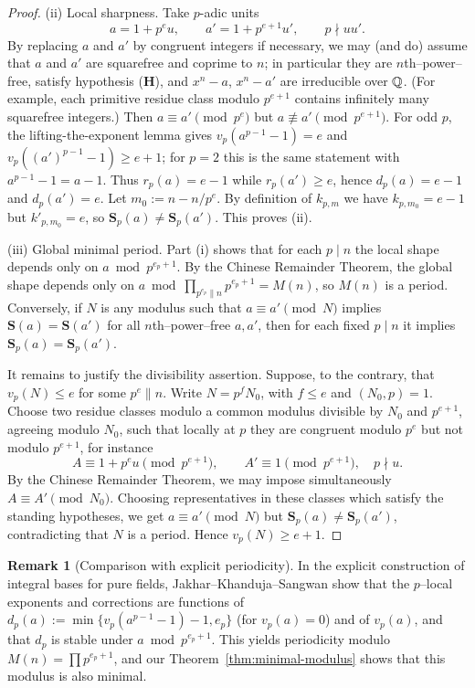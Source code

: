 \documentclass[12pt,a4paper,oneside]{amsart}
\theoremstyle{definition}
\newtheorem{remark}[theorem]{Remark}
\begin{document}
\begin{proof}
\smallskip
\noindent\textup{(ii) Local sharpness.}
Take $p$-adic units
\[
a=1+p^{e}u,\qquad a'=1+p^{e+1}u',\qquad p\nmid uu'.
\]
By replacing $a$ and $a'$ by congruent integers if necessary, we may (and do) assume that
$a$ and $a'$ are squarefree and coprime to $n$; in particular they are $n$th--power--free,
satisfy hypothesis (\textbf{H}), and $x^n-a$, $x^n-a'$ are irreducible over $\Bbb Q$.
(For example, each primitive residue class modulo $p^{e+1}$ contains infinitely many squarefree integers.) Then $a\equiv a'\pmod{p^{e}}$ but $a\not\equiv a'\pmod{p^{e+1}}$.
For odd $p$, the lifting-the-exponent lemma gives $v_p(a^{p-1}-1)=e$ and $v_p((a')^{p-1}-1)\ge e+1$; for $p=2$ this is the same statement with $a^{p-1}-1=a-1$.
Thus $r_p(a)=e-1$ while $r_p(a')\ge e$, hence $d_p(a)=e-1$ and $d_p(a')=e$.
Let $m_0:=n-n/p^{e}$. By definition of $k_{p,m}$ we have $k_{p,m_0}=e-1$ but $k'_{p,m_0}=e$, so $\mathbf S_p(a)\ne\mathbf S_p(a')$. This proves \textup{(ii)}.

\smallskip
\noindent\textup{(iii) Global minimal period.}
Part \textup{(i)} shows that for each $p\mid n$ the local shape depends only on $a\bmod p^{e_p+1}$. By the Chinese Remainder Theorem, the global shape depends only on
$a\bmod\prod_{p^{e_p}\parallel n}p^{e_p+1}=M(n)$, so $M(n)$ is a period.
Conversely, if $N$ is any modulus such that $a\equiv a'\pmod N$ implies $\mathbf S(a)=\mathbf S(a')$ for all $n$th–power–free $a,a'$, then for each fixed $p\mid n$ it implies $\mathbf S_p(a)=\mathbf S_p(a')$. 

It remains to justify the divisibility assertion. Suppose, to the contrary, that
\(v_p(N)\le e\) for some \(p^e\parallel n\). Write \(N=p^fN_0\), with
\(f\le e\) and \((N_0,p)=1\). Choose two residue classes modulo a common
modulus divisible by \(N_0\) and \(p^{e+1}\), agreeing modulo \(N_0\), such that
locally at \(p\) they are congruent modulo \(p^e\) but not modulo \(p^{e+1}\),
for instance
\[
A\equiv 1+p^eu\pmod{p^{e+1}},\qquad
A'\equiv 1\pmod{p^{e+1}},
\quad p\nmid u.
\]
By the Chinese Remainder Theorem, we may impose simultaneously
\(A\equiv A'\pmod{N_0}\). Choosing representatives in these classes which
satisfy the standing hypotheses, we get \(a\equiv a'\pmod N\) but
\(\mathbf S_p(a)\ne\mathbf S_p(a')\), contradicting that \(N\) is a period.
Hence \(v_p(N)\ge e+1\).
\end{proof}




\begin{remark}[Comparison with explicit periodicity]
In the explicit construction of integral bases for pure fields, Jakhar--Khanduja--Sangwan show that the $p$–local exponents and corrections are functions of $d_p(a):=\min\{v_p(a^{p-1}-1)-1,e_p\}$ (for $v_p(a)=0$) and of $v_p(a)$, and that $d_p$ is stable under $a\bmod p^{e_p+1}$. This yields periodicity modulo $M(n)=\prod p^{e_p+1}$, and our Theorem~\ref{thm:minimal-modulus} shows that this modulus is also minimal.
\end{remark}
\end{document}
